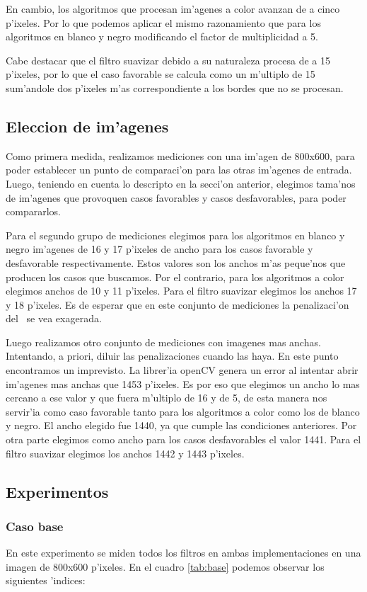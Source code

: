 En cambio, los algoritmos que procesan im'agenes a color avanzan de a cinco p'ixeles. Por lo que podemos aplicar el mismo razonamiento que para los algoritmos en blanco y negro modificando el factor de multiplicidad a 5.

Cabe destacar que el filtro suavizar debido a su naturaleza procesa de a 15 p'ixeles, por lo que el caso favorable se calcula como un m'ultiplo de 15 sum'andole dos p'ixeles m'as correspondiente a los bordes que no se procesan.

\subsection{Eleccion de im'agenes}
Como primera medida, realizamos mediciones con una im'agen de 800x600, para poder establecer un punto de comparaci'on para las otras im'agenes de entrada. Luego, teniendo en cuenta lo descripto en la secci'on anterior, elegimos tama'nos de im'agenes que provoquen casos favorables y casos desfavorables, para poder compararlos. 

Para el segundo grupo de mediciones elegimos para los algoritmos en blanco y negro im'agenes de 16 y 17 p'ixeles de ancho para los casos favorable y desfavorable respectivamente. Estos valores son los anchos m'as peque'nos que producen los casos que buscamos. Por el contrario, para los algoritmos a color elegimos anchos de 10 y 11 p'ixeles. Para el filtro suavizar elegimos los anchos 17 y 18 p'ixeles. Es de esperar que en este conjunto de mediciones la penalizaci'on del \ass \ se vea exagerada.

Luego realizamos otro conjunto de mediciones con imagenes mas anchas. Intentando, a priori, diluir las penalizaciones cuando las haya. En este punto encontramos un imprevisto. La librer'ia openCV genera un error al intentar abrir im'agenes mas anchas que 1453 p'ixeles. Es por eso que elegimos un ancho lo mas cercano a ese valor y que fuera m'ultiplo de 16 y de 5, de esta manera nos servir'ia como caso favorable tanto para los algoritmos a color como los de blanco y negro. El ancho elegido fue 1440, ya que cumple las condiciones anteriores. Por otra parte elegimos como ancho para los casos desfavorables el valor 1441. Para el filtro suavizar elegimos los anchos 1442 y 1443 p'ixeles.

\subsection{Experimentos}
\subsubsection{Caso base}
En este experimento se miden todos los filtros en ambas implementaciones en una imagen de 800x600 p'ixeles. En el cuadro \ref{tab:base} podemos observar los siguientes 'indices:

